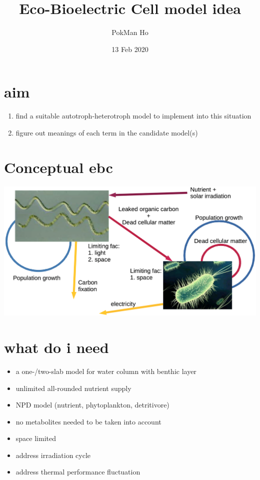 \documentclass[a4paper,11pt]{article}
\title{Eco-Bioelectric Cell model idea}
\author{PokMan Ho}
\date{13 Feb 2020}
\begin{document}
    \maketitle
    \tableofcontents
    
    \section{aim}
    \begin{enumerate}
        \item find a suitable autotroph-heterotroph model to implement into this situation
        \item figure out meanings of each term in the candidate model(s)
    \end{enumerate}
    \section{Conceptual ebc}
    \includegraphics[width=\linewidth]{sandbox/graph/model_01.png}
    \section{what do i need}
    \begin{itemize}
        \item a one-/two-slab model for water column with benthic layer
        \item unlimited all-rounded nutrient supply
        \item NPD model (nutrient, phytoplankton, detritivore)
        \item no metabolites needed to be taken into account
        \item space limited
        \item address irradiation cycle
        \item address thermal performance fluctuation
    \end{itemize}
\end{document}
